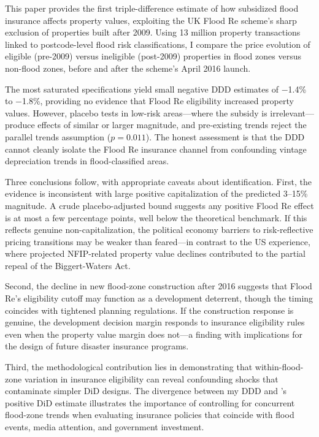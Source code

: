 \documentclass[12pt]{article}
\begin{document}
This paper provides the first triple-difference estimate of how subsidized flood insurance affects property values, exploiting the UK Flood Re scheme's sharp exclusion of properties built after 2009. Using 13 million property transactions linked to postcode-level flood risk classifications, I compare the price evolution of eligible (pre-2009) versus ineligible (post-2009) properties in flood zones versus non-flood zones, before and after the scheme's April 2016 launch.

The most saturated specifications yield small negative DDD estimates of $-$1.4\% to $-$1.8\%, providing no evidence that Flood Re eligibility increased property values. However, placebo tests in low-risk areas---where the subsidy is irrelevant---produce effects of similar or larger magnitude, and pre-existing trends reject the parallel trends assumption ($p = 0.011$). The honest assessment is that the DDD cannot cleanly isolate the Flood Re insurance channel from confounding vintage depreciation trends in flood-classified areas.

Three conclusions follow, with appropriate caveats about identification. First, the evidence is inconsistent with large positive capitalization of the predicted 3--15\% magnitude. A crude placebo-adjusted bound suggests any positive Flood Re effect is at most a few percentage points, well below the theoretical benchmark. If this reflects genuine non-capitalization, the political economy barriers to risk-reflective pricing transitions may be weaker than feared---in contrast to the US experience, where projected NFIP-related property value declines contributed to the partial repeal of the Biggert-Waters Act.

Second, the decline in new flood-zone construction after 2016 suggests that Flood Re's eligibility cutoff may function as a development deterrent, though the timing coincides with tightened planning regulations. If the construction response is genuine, the development decision margin responds to insurance eligibility rules even when the property value margin does not---a finding with implications for the design of future disaster insurance programs.

Third, the methodological contribution lies in demonstrating that within-flood-zone variation in insurance eligibility can reveal confounding shocks that contaminate simpler DiD designs. The divergence between my DDD and \citet{garbarino2024effect}'s positive DiD estimate illustrates the importance of controlling for concurrent flood-zone trends when evaluating insurance policies that coincide with flood events, media attention, and government investment.
\end{document}
